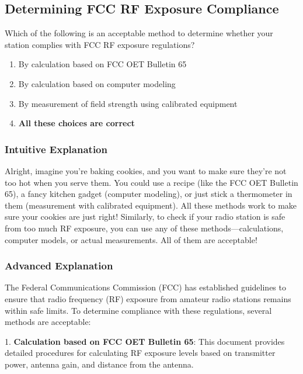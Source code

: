 \subsection{Determining FCC RF Exposure Compliance}
\label{T0C06}

\begin{tcolorbox}[colback=gray!10!white,colframe=black!75!black,title=T0C06]
Which of the following is an acceptable method to determine whether your station complies with FCC RF exposure regulations?
\begin{enumerate}[label=\Alph*)]
    \item By calculation based on FCC OET Bulletin 65
    \item By calculation based on computer modeling
    \item By measurement of field strength using calibrated equipment
    \item \textbf{All these choices are correct}
\end{enumerate}
\end{tcolorbox}

\subsubsection{Intuitive Explanation}
Alright, imagine you’re baking cookies, and you want to make sure they’re not too hot when you serve them. You could use a recipe (like the FCC OET Bulletin 65), a fancy kitchen gadget (computer modeling), or just stick a thermometer in them (measurement with calibrated equipment). All these methods work to make sure your cookies are just right! Similarly, to check if your radio station is safe from too much RF exposure, you can use any of these methods—calculations, computer models, or actual measurements. All of them are acceptable!

\subsubsection{Advanced Explanation}
The Federal Communications Commission (FCC) has established guidelines to ensure that radio frequency (RF) exposure from amateur radio stations remains within safe limits. To determine compliance with these regulations, several methods are acceptable:

1. \textbf{Calculation based on FCC OET Bulletin 65}: This document provides detailed procedures for calculating RF exposure levels based on transmitter power, antenna gain, and distance from the antenna.

